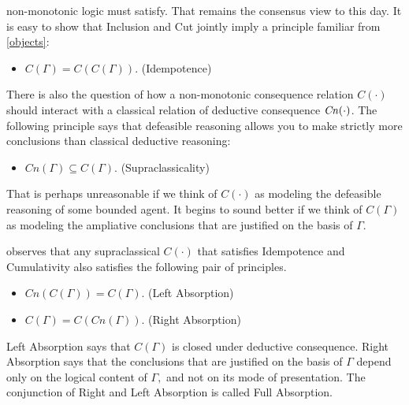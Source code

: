 non-monotonic logic must satisfy. That remains the consensus view to this day.
It is easy to show that Inclusion and Cut jointly imply a principle familiar
from \autoref{objects}:
\begin{itemize}
\item[] $C(\Gamma) = C(C(\Gamma))$. \hfill(Idempotence)
\end{itemize}
There is also the question of how a non-monotonic consequence relation
$C(\cdot)$ should interact with a classical relation of deductive consequence
$\text{\textit{Cn}}(\cdot)$. The following principle says that defeasible reasoning allows you
to make strictly more conclusions than classical deductive reasoning:
\begin{itemize}
\item[] $Cn(\Gamma) \subseteq C(\Gamma)$. \hfill(Supraclassicality)
\end{itemize}
That is perhaps unreasonable if we think of $C(\cdot)$ as modeling the
defeasible reasoning of some bounded agent. It begins to sound better if we
think of $C(\Gamma)$ as modeling the ampliative conclusions that are justified
on the basis of $\Gamma$.

\citet{makinson1994general} observes that any supraclassical $C(\cdot)$ that
satisfies Idempotence and Cumulativity also satisfies the following pair of
principles.
\begin{itemize}
\item[] $Cn(C(\Gamma)) = C(\Gamma)$. \hfill(Left Absorption)
\item[] $C(\Gamma) = C(Cn(\Gamma))$. \hfill(Right Absorption)
\end{itemize}
Left Absorption says that $C(\Gamma)$ is closed under deductive consequence.
Right Absorption says that the conclusions that are justified on the basis of
$\Gamma$ depend only on the logical content of $\Gamma,$ and not on its mode of
presentation. The conjunction of Right and Left Absorption is called Full
Absorption.

